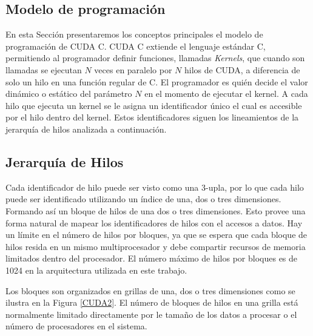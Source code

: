 \documentclass[a4paper,openright,12pt, oneside]{book}
\begin{document}
\subsection{Modelo de programaci\'on}

En esta Secci\'on presentaremos los conceptos principales el modelo de programaci\'on
de CUDA C. CUDA C extiende el lenguaje est\'andar C, permitiendo al programador definir
funciones, llamadas \textit{Kernels}, que cuando son llamadas se ejecutan $N$ veces
en paralelo por $N$ hilos de CUDA, a diferencia de solo un hilo en una funci\'on regular
de C. El programador es qui\'en decide el valor din\'amico o est\'atico del par\'ametro $N$
en el momento de ejecutar el kernel. A cada hilo que ejecuta un kernel se le asigna
un identificador \'unico el cual es accesible por el hilo dentro del kernel. Estos identificadores
siguen los lineamientos de la jerarqu\'ia de hilos analizada a continuaci\'on.

\subsection*{Jerarqu\'ia de Hilos}

Cada identificador de hilo puede ser visto como una 3-upla, por lo que cada hilo
puede ser identificado utilizando un \'indice de una, dos o tres dimensiones. Formando as\'i
un bloque de hilos de una dos o tres dimensiones. Esto provee una forma natural de
mapear los identificadores de hilos con el accesos a datos. Hay un l\'imite en el 
n\'umero de hilos por bloques, ya que se espera que cada bloque de hilos resida en 
un mismo multiprocesador y debe compartir recursos de memoria limitados dentro
del procesador. El n\'umero m\'aximo de hilos por bloques es de 1024 en la arquitectura
utilizada en este trabajo.

Los bloques son organizados en grillas de una, dos o tres dimensiones como se ilustra
en la Figura \ref{CUDA2}. El n\'umero de bloques de hilos en una grilla est\'a normalmente
limitado directamente por le tama\~no de los datos a procesar o el n\'umero de procesadores
en el sistema.
\end{document}
